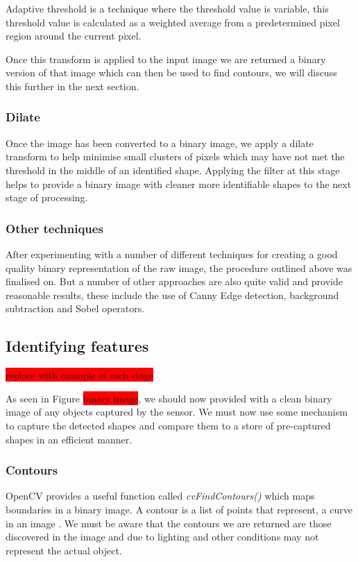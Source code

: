 Adaptive threshold is a technique where the threshold value is variable, this threshold value is calculated as a weighted average from a predetermined pixel region around the current pixel.

Once this transform is applied to the input image we are returned a binary version of that image which can then be used to find contours, we will discuss this further in the next section.


\subsubsection{Dilate}
Once the image has been converted to a binary image, we apply a dilate transform to help minimise small clusters of pixels which may have not met the threshold in the middle of an identified shape. Applying the filter at this stage helps to provide a binary image with cleaner more identifiable shapes to the next stage of processing.


\subsubsection{Other techniques}
After experimenting with a number of different techniques for creating a good quality binary representation of the raw image, the procedure outlined above was finalised on. But a number of other approaches are also quite valid and provide reasonable results, these include the use of Canny Edge detection, background subtraction and Sobel operators.


\subsection{Identifying features}

\colorbox{red}{replace with example of each stage}

As seen in Figure \colorbox{red}{binary image}, we should now provided with a clean binary image of any objects captured by the sensor. We must now use some mechanism to capture the detected shapes and compare them to a store of pre-captured shapes in an efficient manner. 

\subsubsection{Contours}
OpenCV provides a useful function called \emph{cvFindContours()} which maps boundaries in a binary image. A contour is a list of points that represent, a curve in an image \cite{bradski08}. We must be aware that the contours we are returned are those discovered in the image and due to lighting and other conditions may not represent the actual object.

